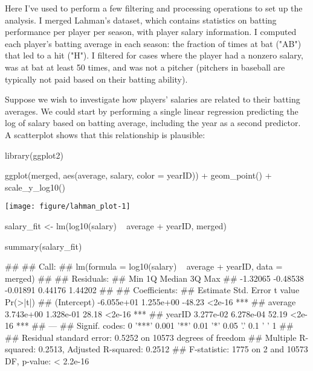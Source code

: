 Here I've used  to perform a few filtering and processing operations to set up the analysis. I merged Lahman's  dataset, which contains statistics on batting performance per player per season, with player salary information. I computed each player's batting average in each season: the fraction of times at bat ("AB") that led to a hit ("H"). I filtered for cases where the player had a nonzero salary, was at bat at least 50 times, and was not a pitcher (pitchers in baseball are typically not paid based on their batting ability).

Suppose we wish to investigate how players' salaries are related to their batting averages. We could start by performing a single linear regression predicting the log of salary based on batting average, including the year as a second predictor. A scatterplot shows that this relationship is plausible:

\begin{center}

\begin{example}
library(ggplot2)
\end{example}

\begin{example}
ggplot(merged, aes(average, salary, color = yearID)) + geom_point() +
    scale_y_log10()
\end{example}

\texttt{[image: figure/lahman\_plot-1]} 
\end{center}


\begin{example}
salary_fit <- lm(log10(salary) ~ average + yearID, merged)
\end{example}

\begin{example}
summary(salary_fit)
\end{example}

\begin{example}
## 
## Call:
## lm(formula = log10(salary) ~ average + yearID, data = merged)
## 
## Residuals:
##      Min       1Q   Median       3Q      Max 
## -1.32065 -0.48538 -0.01891  0.44176  1.44202 
## 
## Coefficients:
##               Estimate Std. Error t value Pr(>|t|)    
## (Intercept) -6.055e+01  1.255e+00  -48.23   <2e-16 ***
## average      3.743e+00  1.328e-01   28.18   <2e-16 ***
## yearID       3.277e-02  6.278e-04   52.19   <2e-16 ***
## ---
## Signif. codes:  0 '***' 0.001 '**' 0.01 '*' 0.05 '.' 0.1 ' ' 1
## 
## Residual standard error: 0.5252 on 10573 degrees of freedom
## Multiple R-squared:  0.2513,	Adjusted R-squared:  0.2512 
## F-statistic:  1775 on 2 and 10573 DF,  p-value: < 2.2e-16

\end{example}


